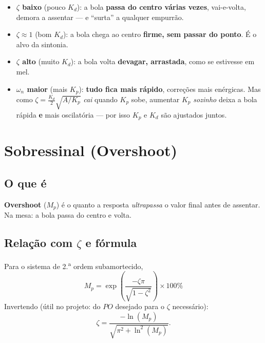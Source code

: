 \begin{projeto}
\begin{itemize}[leftmargin=1.4em]
  \item \textbf{$\zeta$ baixo} (pouco $K_d$): a bola \textbf{passa do centro v\'arias
  vezes}, vai-e-volta, demora a assentar --- e ``surta'' a qualquer empurr\~ao.
  \item \textbf{$\zeta\approx1$} (bom $K_d$): a bola chega ao centro \textbf{firme,
  sem passar do ponto}. \'E o alvo da sintonia.
  \item \textbf{$\zeta$ alto} (muito $K_d$): a bola volta \textbf{devagar, arrastada},
  como se estivesse em mel.
  \item \textbf{$\omega_n$ maior} (mais $K_p$): \textbf{tudo fica mais r\'apido},
  corre\c{c}\~oes mais en\'ergicas. Mas como $\zeta=\tfrac{K_d}{2}\sqrt{A/K_p}$
  \emph{cai} quando $K_p$ sobe, aumentar $K_p$ \emph{sozinho} deixa a bola r\'apida
  \textbf{e} mais oscilat\'oria --- por isso $K_p$ e $K_d$ s\~ao ajustados juntos.
\end{itemize}
\end{projeto}

\chapter{Sobressinal (Overshoot)}\label{cap:overshoot}

\section{O que \'e}
\textbf{Overshoot} ($M_p$) \'e o quanto a resposta \emph{ultrapassa} o valor final
antes de assentar. Na mesa: a bola passa do centro e volta.

\section{Rela\c{c}\~ao com $\zeta$ e f\'ormula}
Para o sistema de 2.\textsuperscript{a} ordem subamortecido,
\begin{equation}
\boxed{\ M_p = \exp\!\left(\dfrac{-\zeta\pi}{\sqrt{1-\zeta^2}}\right)\times 100\%\ }
\label{eq:mp}
\end{equation}
Invertendo (\'util no projeto: do $PO$ desejado para o $\zeta$ necess\'ario):
\begin{equation}
\zeta = \frac{-\ln(M_p)}{\sqrt{\pi^2+\ln^2(M_p)}}.
\end{equation}

